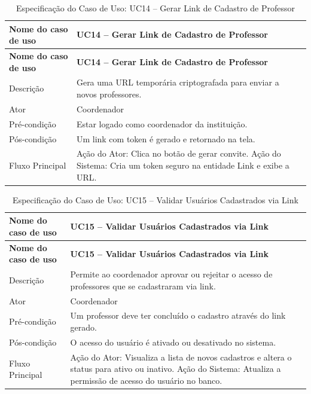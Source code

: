 \fonteautores

\vspace{\baselineskip}

\Needspace{0.48\textheight}
\begin{longtable}{|L{4.5cm}|L{10.5cm}|}
\caption{Especificação do Caso de Uso: UC14 -- Gerar Link de Cadastro de Professor} \\
\hline
\textbf{Nome do caso de uso} & \textbf{UC14 -- Gerar Link de Cadastro de Professor} \\
\hline
\endfirsthead
\hline
\textbf{Nome do caso de uso} & \textbf{UC14 -- Gerar Link de Cadastro de Professor} \\
\hline
\endhead
Descrição       & Gera uma URL temporária criptografada para enviar a novos professores. \\
\hline
Ator            & Coordenador \\
\hline
Pré-condição    & Estar logado como coordenador da instituição. \\
\hline
Pós-condição    & Um link com token é gerado e retornado na tela. \\
\hline
Fluxo Principal & Ação do Ator: Clica no botão de gerar convite. Ação do Sistema: Cria um token seguro na entidade Link e exibe a URL. \\
\hline
\end{longtable}

\fonteautores

\vspace{\baselineskip}

\Needspace{0.48\textheight}
\begin{longtable}{|L{4.5cm}|L{10.5cm}|}
\caption{Especificação do Caso de Uso: UC15 -- Validar Usuários Cadastrados via Link} \\
\hline
\textbf{Nome do caso de uso} & \textbf{UC15 -- Validar Usuários Cadastrados via Link} \\
\hline
\endfirsthead
\hline
\textbf{Nome do caso de uso} & \textbf{UC15 -- Validar Usuários Cadastrados via Link} \\
\hline
\endhead
Descrição       & Permite ao coordenador aprovar ou rejeitar o acesso de professores que se cadastraram via link. \\
\hline
Ator            & Coordenador \\
\hline
Pré-condição    & Um professor deve ter concluído o cadastro através do link gerado. \\
\hline
Pós-condição    & O acesso do usuário é ativado ou desativado no sistema. \\
\hline
Fluxo Principal & Ação do Ator: Visualiza a lista de novos cadastros e altera o status para ativo ou inativo. Ação do Sistema: Atualiza a permissão de acesso do usuário no banco. \\
\hline
\end{longtable}

